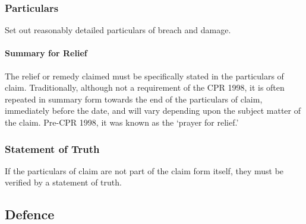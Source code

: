 \documentclass[
]{article}
\begin{document}
\hypertarget{particulars}{%
\subsubsection{Particulars}\label{particulars}}

Set out reasonably detailed particulars of breach and damage.

\hypertarget{summary-for-relief}{%
\paragraph{Summary for Relief}\label{summary-for-relief}}

The relief or remedy claimed must be specifically stated in the
particulars of claim. Traditionally, although not a requirement of the
CPR 1998, it is often repeated in summary form towards the end of the
particulars of claim, immediately before the date, and will vary
depending upon the subject matter of the claim. Pre-CPR 1998, it was
known as the `prayer for relief.'

\hypertarget{statement-of-truth-1}{%
\subsubsection{Statement of Truth}\label{statement-of-truth-1}}

If the particulars of claim are not part of the claim form itself, they
must be verified by a statement of truth.

\hypertarget{defence}{%
\subsection{Defence}\label{defence}}
\end{document}
